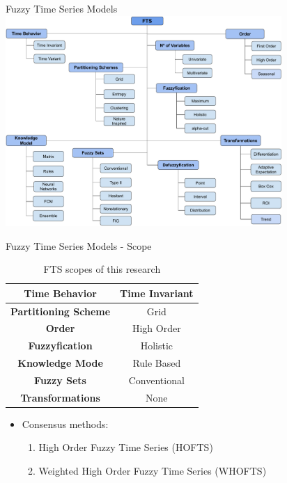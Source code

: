 \documentclass{beamer}
\begin{document}
\begin{frame}{Fuzzy Time Series Models}
\includegraphics[width=\textwidth,height=8cm]{figures/fts_taxonomy.pdf}
\end{frame}



\begin{frame}{Fuzzy Time Series Models - Scope}
\begin{table}[]
    \centering
    \begin{tabular}{|c|c|} \hline
         \textbf{Time Behavior} & Time Invariant  \\ \hline
         \textbf{Partitioning Scheme} & Grid  \\ \hline
         \textbf{Order} & High Order  \\ \hline
         \textbf{Fuzzyfication} & Holistic  \\ \hline
         \textbf{Knowledge Mode} & Rule Based  \\ \hline
         \textbf{Fuzzy Sets} & Conventional  \\ \hline
         \textbf{Transformations} & None  \\ \hline
    \end{tabular}
    \caption{FTS scopes of this research}
\end{table}
\begin{itemize}
    \item Consensus methods:
    \begin{enumerate}
        \item High Order Fuzzy Time Series (HOFTS)
        \item Weighted High Order Fuzzy Time Series (WHOFTS)
    \end{enumerate}
\end{itemize}
\end{frame}
\end{document}
